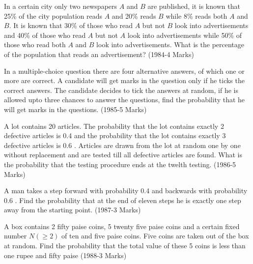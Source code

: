     \item In a certain city only two newspapers $A$ and $B$ are published, it is known that 25\% of the city population reads $A$ and 20\% reads $B$ while 8\% reads both $A$ and $B$. It is known that 30\% of those who read $A$ but not $B$ look into advertisements and 40\% of those who read $A$ but not $A$ look into advertisements while 50\% of those who read both $A$ and $B$ look into advertisements. What is the percentage of the population that reads an advertisement?
    \hfill{(1984-4 Marks)}
    \item In a multiple-choice question there are four alternative answers, of which one or more are correct. A candidate will get marks in the question only if he ticks the correct answers. The candidate decides to tick the answers at random, if he is allowed upto three chances to answer the questions, find the probability that he will get marks in the questions.
    \hfill{(1985-5 Marks)}
    \item A lot contains 20 articles. The probability that the lot contains exactly 2 defective articles is 0.4 and the probability that the lot contains exactly 3 defective articles is 0.6 . Articles are drawn from the lot at random one by one without replacement and are tested till all defective articles are found. What is the probability that the testing procedure ends at the twelth testing.
    \hfill{(1986-5 Marks)}
    \item A  man  takes  a step forward with probability 0.4 and backwards with probability 0.6 . Find the probability that at the end of eleven steps he is exactly one step away from the starting point.
    \hfill{(1987-3 Marks)}
    \item A box contains 2 fifty paise coins, 5 twenty five paise coins and a certain fixed number $N (\ge2)$ of ten and five paise coins. Five coins are taken out of the box at random. Find the probability that the total value of these 5 coins is less than one rupee and fifty paise
    \hfill{(1988-3 Marks)}
